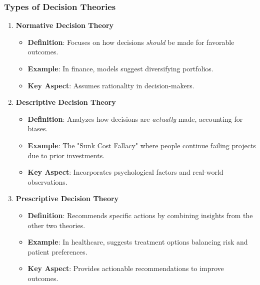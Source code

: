 \documentclass[aspectratio=169]{beamer}
\begin{document}
\begin{frame}[fragile]
    \frametitle{Types of Decision Theories}
    
    \begin{enumerate}
        \item \textbf{Normative Decision Theory}
        \begin{itemize}
            \item \textbf{Definition}: Focuses on how decisions \textit{should} be made for favorable outcomes.
            \item \textbf{Example}: In finance, models suggest diversifying portfolios.
            \item \textbf{Key Aspect}: Assumes rationality in decision-makers.
        \end{itemize}
        
        \item \textbf{Descriptive Decision Theory}
        \begin{itemize}
            \item \textbf{Definition}: Analyzes how decisions are \textit{actually} made, accounting for biases.
            \item \textbf{Example}: The "Sunk Cost Fallacy" where people continue failing projects due to prior investments.
            \item \textbf{Key Aspect}: Incorporates psychological factors and real-world observations.
        \end{itemize}
        
        \item \textbf{Prescriptive Decision Theory}
        \begin{itemize}
            \item \textbf{Definition}: Recommends specific actions by combining insights from the other two theories.
            \item \textbf{Example}: In healthcare, suggests treatment options balancing risk and patient preferences.
            \item \textbf{Key Aspect}: Provides actionable recommendations to improve outcomes.
        \end{itemize}
    \end{enumerate}
\end{frame}
\end{document}

